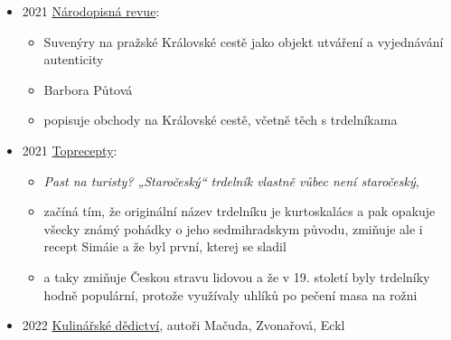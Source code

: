\begin{itemize}
  \begin{itemize}
  \tightlist
  \item
    Lucie Kubásková, Jana Jírovcová
  \item
    potvrzujou, co si myslím i já, a to že se zánikem černý kuchyně
    obliba trdelníků opadla a že se taky změnila jejich forma,
    zmenšovaly se
  \item
    rozšíření od moravsko-slovenskýho pomezí po Mikulovsko a Znojemsko,
    nejdýl se udržely na Uherskobrodsku, ještě ve 30. -\/- 50. letech se
    pekly ve Vlčnově
  \item
    pekly se na masopust jako pohoštění a výslužka pro fašankáře, pro
    šestinedělky, na svatby a křtiny
  \item
    po opuštění černých kuchyní se postupně zmenšovaly, pekly se na
    lodyze z kukuřice nebo plechových trubičkách, vznikly z nich
    trubičky z listovýho těsta plněný sněhem z ušlehanejch bílků (a co
    kremrole?)
  \item
    smažený trdelníky se dělají z kynutýho koblihovýho těsta
  \end{itemize}
\item
  2021
  \href{https://revue.nulk.cz/wp-content/uploads/2022/01/r4-2021-1.pdf\#page=16}{Národopisná
  revue}:

  \begin{itemize}
  \tightlist
  \item
    Suvenýry na pražské Královské cestě jako objekt utváření a
    vyjednávání autenticity
  \item
    Barbora Půtová
  \item
    popisuje obchody na Královské cestě, včetně těch s trdelníkama
  \end{itemize}
\item
  2021
  \href{https://www.toprecepty.cz/clanky/1566-past-na-turisty-starocesky-trdelnik-vlastne-vubec-neni-starocesky/}{Toprecepty}:

  \begin{itemize}
  \tightlist
  \item
    \emph{Past na turisty? „Staročeský`` trdelník vlastně vůbec není
    staročeský}, 
  \item
    začíná tím, že originální název trdelníku je kurtoskalács a pak
    opakuje všecky známý pohádky o jeho sedmihradskym původu, zmiňuje
    ale i recept Simáie a že byl první, kterej se sladil
  \item
    a taky zmiňuje Českou stravu lidovou a že v 19. století byly
    trdelníky hodně populární, protože využívaly uhlíků po pečení masa
    na rožni
  \end{itemize}
\item
  2022
  \href{https://wirtschaftsmuseum.at/media/downloads/Interreg/Kucharka_Kochbuch_WEB.pdf}{Kulinářské
  dědictví}, autoři Mačuda, Zvonařová, Eckl


\end{itemize}
